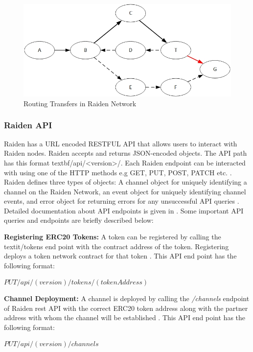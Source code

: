 \begin{figure}[h]
	\centering
    \includegraphics[width=120mm,scale=1]{figs/TransferRouting}
	\caption{Routing Transfers in Raiden Network \cite{rad:001}}
	\label{fig:TR}
\end{figure}

\vspace{0.5cm}
\subsubsection{Raiden API}	\label{R-API}	
Raiden has a URL encoded RESTFUL API that allows users to interact with Raiden nodes. Raiden accepts and returns JSON-encoded objects. The API path has this format textbf{/api/<version>/}. Each Raiden endpoint can be interacted with using one of the HTTP methods e.g GET, PUT, POST, PATCH etc. . Raiden defines three types of objects: A channel object for uniquely identifying a channel on the Raiden Network, an event object for uniquely identifying channel events, and error object for returning errors for any unsuccessful API queries \cite{rad:001}. Detailed documentation about API endpoints is given in \cite{rad:001}. Some important API queries and endpoints are briefly described below:

\textbf{Registering ERC20 Tokens:} A token can be registered by calling the textit{/tokens} end point with the contract address of the token. Registering deploys a token network contract for that token \cite{rad:001}. This API end point has the following format: 

\textbf{$PUT /api/(version)/tokens/(tokenAddress)$} \cite{rad:001}

\textbf{Channel Deployment:} A channel is deployed by calling the \textit{/channels} endpoint of Raiden rest API with the correct ERC20 token address along with the partner address with whom the channel will be established \cite{rad:001}. This API end point has the following format: 

\textbf{$PUT /api/(version)/channels$} \cite{rad:001}

